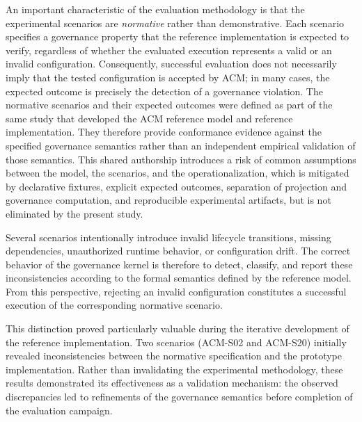 \documentclass[10pt]{article}
\begin{document}
An important characteristic of the evaluation methodology is that the
experimental scenarios are \emph{normative} rather than demonstrative. Each scenario specifies a governance property that the reference implementation is expected to verify, regardless of whether the evaluated execution represents a valid or an invalid configuration. Consequently, successful evaluation does not necessarily imply that the tested configuration is accepted by ACM; in many cases, the expected outcome is precisely the detection of a governance
violation.
The normative scenarios and their expected outcomes were defined as part of the same study that developed the ACM reference model and reference implementation. They therefore provide conformance evidence against the specified governance semantics rather than an independent empirical validation of those semantics. This shared authorship introduces a risk of common assumptions between the model, the scenarios, and the operationalization, which is mitigated by declarative fixtures, explicit expected outcomes, separation of projection and governance computation, and reproducible experimental artifacts, but is not eliminated by the present study.

Several scenarios intentionally introduce invalid lifecycle transitions, missing dependencies, unauthorized runtime behavior, or configuration drift. The correct behavior of the governance kernel is therefore to detect, classify, and report these inconsistencies according to the formal semantics defined by the reference model. From this perspective, rejecting an invalid configuration constitutes a successful execution of the corresponding normative scenario.

This distinction proved particularly valuable during the iterative development of the reference implementation. Two scenarios (ACM-S02 and ACM-S20) initially revealed inconsistencies between the normative specification and the prototype implementation. Rather than invalidating the experimental methodology, these results demonstrated its effectiveness as a validation mechanism: the observed discrepancies led to refinements of the governance semantics before completion of the evaluation campaign.
\end{document}
